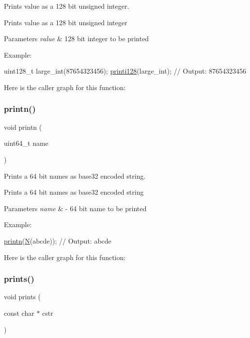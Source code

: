 Prints value as a 128 bit unsigned integer. 

Prints value as a 128 bit unsigned integer 
\begin{DoxyParams}{Parameters}
{\em value} & 128 bit integer to be printed\\
\hline
\end{DoxyParams}
Example\+: 
\begin{DoxyCode}
uint128\_t large\_int(87654323456);
\mbox{\hyperlink{group__consolecapi_ga0ac41ae1c31cf87a4adc14d9edb3e6a5}{printi128}}(large\_int); \textcolor{comment}{// Output: 87654323456}
\end{DoxyCode}
 Here is the caller graph for this function\+:
\mbox{\label{group__consolecapi_ga9ec6a2d163a27b98984065d55fb41475}} 
\subsubsection{\texorpdfstring{printn()}{printn()}}
{\footnotesize\ttfamily void printn (\begin{DoxyParamCaption}\item[{uint64\+\_\+t}]{name }\end{DoxyParamCaption})}



Prints a 64 bit names as base32 encoded string. 

Prints a 64 bit names as base32 encoded string 
\begin{DoxyParams}{Parameters}
{\em name} & -\/ 64 bit name to be printed\\
\hline
\end{DoxyParams}
Example\+: 
\begin{DoxyCode}
\mbox{\hyperlink{group__consolecapi_ga9ec6a2d163a27b98984065d55fb41475}{printn}}(\mbox{\hyperlink{group__types_gaf9c1edb0e0da55ec6ba09f32f6839529}{N}}(abcde)); \textcolor{comment}{// Output: abcde}
\end{DoxyCode}
 Here is the caller graph for this function\+:
\mbox{\label{group__consolecapi_gaa99be0cc1b9e5cbbc2b12a43537e7ed3}} 
\subsubsection{\texorpdfstring{prints()}{prints()}}
{\footnotesize\ttfamily void prints (\begin{DoxyParamCaption}\item[{const char $\ast$}]{cstr }\end{DoxyParamCaption})}




